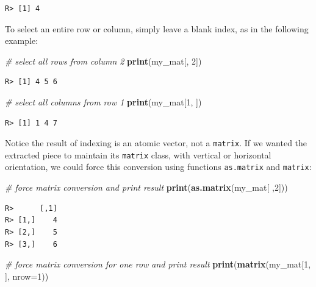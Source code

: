 \documentclass[
  12pt,
]{book}
\newenvironment{Shaded}{\begin{snugshade}}{\end{snugshade}}
\newcommand{\CommentTok}[1]{\textcolor[rgb]{0.37,0.37,0.37}{\textit{#1}}}
\newcommand{\DataTypeTok}[1]{\textcolor[rgb]{0.27,0.27,0.27}{#1}}
\newcommand{\DecValTok}[1]{\textcolor[rgb]{0.06,0.06,0.06}{#1}}
\newcommand{\KeywordTok}[1]{\textcolor[rgb]{0.27,0.27,0.27}{\textbf{#1}}}
\newcommand{\NormalTok}[1]{#1}
\begin{document}
\begin{verbatim}
R> [1] 4
\end{verbatim}

To select an entire row or column, simply leave a blank index, as in the following example:

\begin{Shaded}
\begin{Highlighting}[]
\CommentTok{# select all rows from column 2}
\KeywordTok{print}\NormalTok{(my_mat[, }\DecValTok{2}\NormalTok{])}
\end{Highlighting}
\end{Shaded}

\begin{verbatim}
R> [1] 4 5 6
\end{verbatim}

\begin{Shaded}
\begin{Highlighting}[]
\CommentTok{# select all columns from row 1}
\KeywordTok{print}\NormalTok{(my_mat[}\DecValTok{1}\NormalTok{, ])}
\end{Highlighting}
\end{Shaded}

\begin{verbatim}
R> [1] 1 4 7
\end{verbatim}

Notice the result of indexing is an atomic vector, not a \texttt{matrix}. If we wanted the extracted piece to maintain its \texttt{matrix} class, with vertical or horizontal orientation, we could force this conversion using functions \texttt{as.matrix} and \texttt{matrix}:  

\begin{Shaded}
\begin{Highlighting}[]
\CommentTok{# force matrix conversion and print result}
\KeywordTok{print}\NormalTok{(}\KeywordTok{as.matrix}\NormalTok{(my_mat[ ,}\DecValTok{2}\NormalTok{]))}
\end{Highlighting}
\end{Shaded}

\begin{verbatim}
R>      [,1]
R> [1,]    4
R> [2,]    5
R> [3,]    6
\end{verbatim}

\begin{Shaded}
\begin{Highlighting}[]
\CommentTok{# force matrix conversion for one row and print result}
\KeywordTok{print}\NormalTok{(}\KeywordTok{matrix}\NormalTok{(my_mat[}\DecValTok{1}\NormalTok{, ], }\DataTypeTok{nrow=}\DecValTok{1}\NormalTok{))}
\end{Highlighting}
\end{Shaded}
\end{document}
